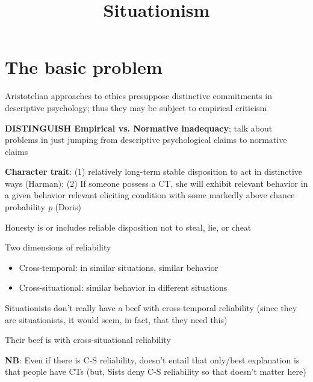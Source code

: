 \documentclass[11pt]{article}
\title{Situationism}
\author{}
\date{}
\begin{document}
\maketitle

\section{The basic problem}

\noindent Aristotelian approaches to ethics presuppose distinctive commitments in descriptive psychology; thus they may be subject to empirical criticism
\vspace*{2mm}

\noindent\textbf{DISTINGUISH Empirical vs. Normative inadequacy}; talk about problems in just jumping from descriptive psychological claims to normative claims
\vspace*{2mm}

\noindent\textbf{Character trait}: (1) relatively long-term stable disposition to act in distinctive ways (Harman); (2) If someone possess a CT, she will exhibit relevant behavior in a given behavior relevant eliciting condition with some markedly above chance probability \emph{p} (Doris)
\vspace*{2mm}

\noindent Honesty is or includes reliable disposition not to steal, lie, or cheat
\vspace*{2mm}

\noindent Two dimensions of reliability

\begin{itemize}\item{Cross-temporal: in similar situations, similar behavior}\item{Cross-situational: similar behavior in different situations}\end{itemize}

\noindent Situationists don't really have a beef with cross-temporal reliability (since they are situationists, it would seem, in fact, that they need this)
\vspace*{2mm}

\noindent Their beef is with cross-situational reliability
\vspace*{2mm}

\noindent\textbf{NB}: Even if there is C-S reliability, doesn't entail that only/best explanation is that people have CTs (but, Sists deny C-S reliability so that doesn't matter here)
\vspace*{2mm}
\end{document}
